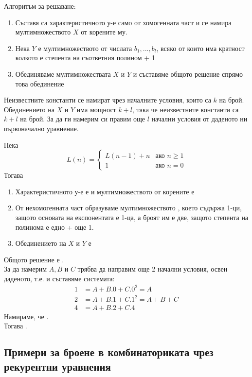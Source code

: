Алгоритъм за решаване:
\begin{enumerate}
    \item Съставя са характеристичното у-е само от хомогенната част и се намира мултимножеството \(X\) от корените му.
    \item Нека \(Y\) е мултимножеството от числата \(b_1, ..., b_l\), всяко от които има кратност колкото 
    е степента на съответния полином + 1
    \item Обединяваме мултимножествата \(X\) и \(Y\) и съставяме общото решение спрямо това обединение
\end{enumerate}

Неизвестните константи се намират чрез началните условия, които са \(k\) на брой. Обединението на \(X\) и \(Y\)
има мощност \(k + l\), така че неизвестните константи са \(k + l\) на брой. За да ги намерим си правим още
\(l\) начални условия от даденото ни първоначално уравнение.

\begin{example}
    Нека 
    \begin{equation*}
        L(n) = 
        \begin{cases}
            L(n - 1) + n & \text{ако \(n \ge 1\)} \\
            1 & \text{ако \(n = 0\)}
        \end{cases}
    \end{equation*}
    Тогава 
    \begin{enumerate}
        \item Характеристичното у-е е  и мултимножеството от корените е 
        \item От нехомогенната част образуваме мултимножеството , което съдържа 1-ци, 
        защото основата на експонентата е 1-ца, а броят им е две, защото степента на полинома е едно + още 1.
        \item Обединението на \(X\) и \(Y\) е 
    \end{enumerate}
    Общото решение е . \\
    За да намерим \(A, B\) и \(C\) трябва да направим още 2 начални условия, освен даденото, т.е.
     и съставяме системата:
    \begin{align*}
        1 &= A + B.0 + C.0^2 = A \\
        2 &= A + B.1 + C.1^2 = A + B + C \\
        4 &= A + B.2 + C.4
    \end{align*}
    Намираме, че . \\
    Тогава .
\end{example}

\subsection{Примери за броене в комбинаториката чрез рекурентни уравнения}